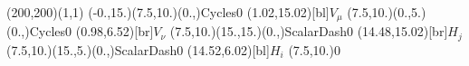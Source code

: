 \documentclass[12pt]{article}
\begin{document}
 
 \thispagestyle{empty}
	
 \begin{feynartspicture}(200,200)(1,1) 
 \FADiagram{} 
\FAProp(-0.,15.)(7.5,10.)(0.,){Cycles}{0}
\FALabel(1.02,15.02)[bl]{$V_{\mu}$}
\FAProp(7.5,10.)(0.,5.)(0.,){Cycles}{0}
\FALabel(0.98,6.52)[br]{$V_{\nu}$}
\FAProp(7.5,10.)(15.,15.)(0.,){ScalarDash}{0}
\FALabel(14.48,15.02)[br]{$H_j$}
\FAProp(7.5,10.)(15.,5.)(0.,){ScalarDash}{0}
\FALabel(14.52,6.02)[bl]{$H_i$}
\FAVert(7.5,10.){0}
	
 
 \end{feynartspicture} 
 
\end{document}
